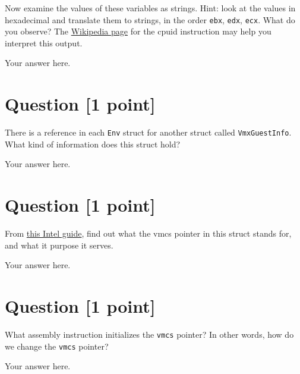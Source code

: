 \documentclass[11pt]{article}
\begin{document}
Now examine the values of these variables as strings. Hint: look at the values in hexadecimal and translate them to strings, in the order \texttt{ebx}, \texttt{edx}, \texttt{ecx}. What do you observe? The \href{https://en.wikipedia.org/wiki/CPUID}{Wikipedia page} for the cpuid instruction may help you interpret this output.

\begin{solution}
Your answer here.
\end{solution}


\section{Question [1 point]}

There is a reference in each \texttt{Env} struct for another struct called \texttt{VmxGuestInfo}. What kind of information does this struct hold?

\begin{solution}
Your answer here.
\end{solution}


\section{Question [1 point]}

From \href{https://www.cs.utexas.edu/~vijay/cs378-f17/projects/64-ia-32-architectures-software-developer-vol-3c-part-3-manual.pdf}{this Intel guide}, find out what the vmcs pointer in this struct stands for, and what it purpose it serves.

\begin{solution}
Your answer here.
\end{solution}


\section{Question [1 point]}

What assembly instruction initializes the \texttt{vmcs} pointer? In other words, how do we change the \texttt{vmcs} pointer?

\begin{solution}
Your answer here.
\end{solution}
\end{document}
